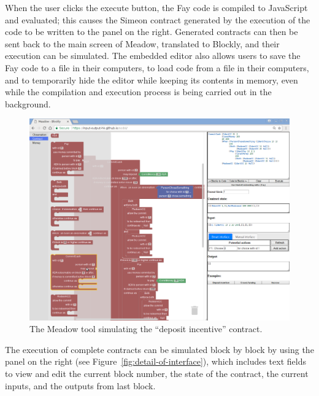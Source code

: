 \documentclass[runningheads]{llncs}
\begin{document}
When the user clicks the execute button, the Fay code is compiled to JavaScript and evaluated; this causes the Simeon 
contract generated by the execution of the code to be written to the panel on the right. Generated contracts can then be 
sent back to the main screen of Meadow, translated to Blockly, and their execution can be simulated. The embedded editor 
also allows users to save the Fay code to a file in their computers, to load code from a file in their computers, and to 
temporarily hide the editor while keeping its contents in memory, even while the compilation and execution process is 
being carried out in the background.

\begin{figure}[t]
\begin{centering}
\includegraphics[width=1.1\textwidth]{pix/screenshot1}
\par\end{centering}
\caption{\label{fig:full-screenshot-demo}The Meadow tool
simulating the ``deposit incentive'' contract.}
\vspace*{-6mm}
\end{figure}


The execution of complete contracts can be simulated block by block
by using the panel on the right (see Figure~\ref{fig:detail-of-interface}),
which includes text fields to view and edit the current block number,
the state of the contract, the current inputs, and the outputs from
last block.
\end{document}
